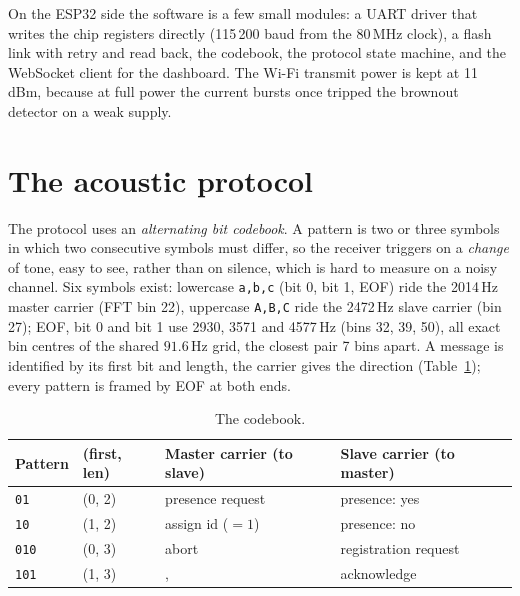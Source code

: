 \documentclass[a4paper,10pt]{article}
\begin{document}
On the ESP32 side the software is a few small modules: a UART driver that writes the chip
registers directly (115\,200 baud from the 80\,MHz clock), a flash link with retry and read
back, the codebook, the protocol state machine, and the WebSocket client for the dashboard.
The Wi-Fi transmit power is kept at 11\,dBm, because at full power the current bursts once
tripped the brownout detector on a weak supply.

\section{The acoustic protocol}
\label{sec:protocol}

The protocol uses an \emph{alternating bit codebook}. A pattern is two or three
symbols in which two consecutive symbols must differ, so the receiver triggers on a
\emph{change} of tone, easy to see, rather than on silence, which is hard to
measure on a noisy channel. Six symbols exist: lowercase \texttt{a,b,c} (bit 0,
bit 1, EOF) ride the 2014\,Hz master carrier (FFT bin 22), uppercase
\texttt{A,B,C} ride the 2472\,Hz slave carrier (bin 27); EOF, bit 0 and bit 1 use
2930, 3571 and 4577\,Hz (bins 32, 39, 50), all exact bin centres of the shared
$91.6$\,Hz grid, the closest pair 7 bins apart. A message is identified by its first
bit and length, the carrier gives the direction (Table~\ref{tab:codebook}); every
pattern is framed by EOF at both ends.

\begin{table}[H]
\centering
\caption{The codebook.}
\label{tab:codebook}
\small
\begin{tabular}{llll}
\toprule
\textbf{Pattern} & \textbf{(first, len)} & \textbf{Master carrier (to slave)} & \textbf{Slave carrier (to master)} \\
\midrule
\texttt{01} & (0, 2) & presence request & presence: yes \\
\texttt{10} & (1, 2) & assign id ($=1$) & presence: no \\
\texttt{010} & (0, 3) & abort & registration request \\
\texttt{101} & (1, 3) &, & acknowledge \\
\bottomrule
\end{tabular}
\end{table}
\end{document}
